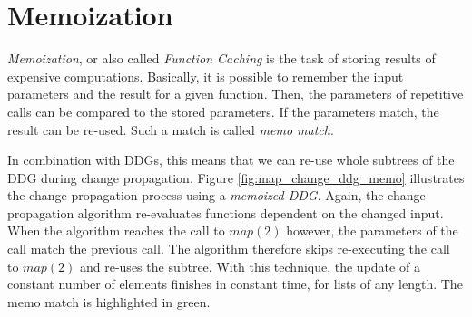 \section{Memoization}

\textit{Memoization}, or also called \textit{Function Caching} is the task of storing results of expensive computations. Basically, it is possible to remember the input parameters and the result for a given function. Then, the parameters of repetitive calls can be compared to the stored parameters. If the parameters match, the result can be re-used. Such a match is called \textit{memo match}.

In combination with DDGs, this means that we can re-use whole subtrees of the DDG during change propagation. Figure \ref{fig:map_change_ddg_memo} illustrates the change propagation process using a \textit{memoized DDG}. Again, the change propagation algorithm re-evaluates functions dependent on the changed input. When the algorithm reaches the call to $map(2)$ however, the parameters of the call match the previous call. The algorithm therefore skips re-executing the call to $map(2)$ and re-uses the subtree. With this technique, the update of a constant number of elements finishes in constant time, for lists of any length. 
The memo match is highlighted in green. 


